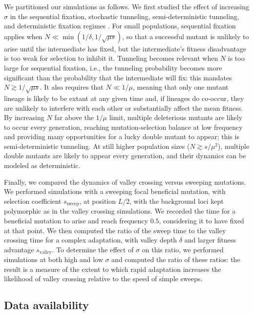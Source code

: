 \documentclass[10pt,twocolumn,twoside]{gsajnl}
\begin{document}
\begin{spacing}{1.5}
We partitioned our simulations as follows.
We first studied the effect of increasing $\sigma$ in the sequential fixation, stochastic tunneling, semi-deterministic tunneling, and deterministic fixation regimes \citep{weissman_2009}.
For small populations, sequential fixation applies when $N \ll \min(1/\delta, 1/\sqrt{\mu s})$, so that a successful mutant is unlikely to arise until the intermediate has fixed, but the intermediate's fitness disadvantage is too weak for selection to inhibit it.
Tunneling becomes relevant when $N$ is too large for sequential fixation, i.e., the tunneling probability becomes more significant than the probability that the intermediate will fix: this mandates $N \gtrsim 1/\sqrt{\mu s}$.
It also requires that $N \ll 1/\mu$, meaning that only one mutant lineage is likely to be extant at any given time and, if lineages do co-occur, they are unlikely to interfere with each other or substantially affect the mean fitness.
By increasing $N$ far above the $1/\mu$ limit, multiple deleterious mutants are likely to occur every generation, reaching mutation-selection balance at low frequency and providing many opportunities for a lucky double mutant to appear; this is semi-deterministic tunneling.
At still higher population sizes ($N \gtrsim s/\mu^2$), multiple double mutants are likely to appear every generation, and their dynamics can be modeled as deterministic.

Finally, we compared the dynamics of valley crossing versus sweeping mutations.
We performed simulations with a sweeping focal beneficial mutation, with selection coefficient $s_{\mathrm{sweep}}$, at position $L/2$, with the background loci kept polymorphic as in the valley crossing simulations.
We recorded the time for a beneficial mutation to arise and reach frequency $0.5$, considering it to have fixed at that point.
We then computed the ratio of the sweep time to the valley crossing time for a complex adaptation, with valley depth $\delta$ and larger fitness advantage $s_{\mathrm{valley}}$.
To determine the effect of $\sigma$ on this ratio, we performed simulations at both high and low $\sigma$ and computed the ratio of these ratios: the result is a measure of the extent to which rapid adaptation increases the likelihood of valley crossing relative to the speed of simple sweeps.

\subsection*{Data availability}


\end{spacing}
\end{document}

